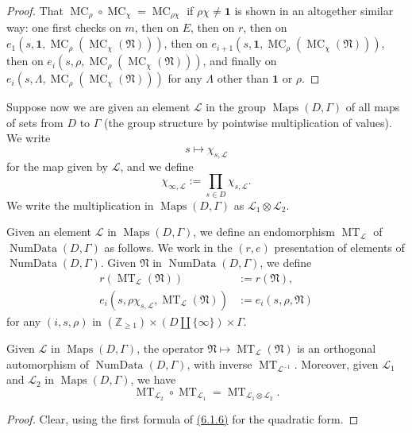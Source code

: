 \begin{proof}
That \(\operatorname{MC}_\rho\circ\operatorname{MC}_\chi=\operatorname{MC}_{\rho\chi}\) if \(\rho\chi\ne\mathbf{1}\) is shown in an altogether similar way: one first checks on \(m\), then on \(E\), then on \(r\), then on \(e_1(s,\mathbf{1},\operatorname{MC}_\rho(\operatorname{MC}_\chi(\mathfrak{N})))\), then on \(e_{i+1}(s,\mathbf{1},\operatorname{MC}_\rho(\operatorname{MC}_\chi(\mathfrak{N})))\), then on \(e_i(s,\rho,\operatorname{MC}_\rho(\operatorname{MC}_\chi(\mathfrak{N})))\), and finally on \(e_i(s,\Lambda,\operatorname{MC}_\rho(\operatorname{MC}_\chi(\mathfrak{N})))\) for any \(\Lambda\) other than \(\mathbf{1}\) or \(\rho\).
\end{proof}

Suppose now we are given an element \(\mathcal{L}\) in the group \(\operatorname{Maps}(D,\Gamma)\) of all maps of sets from \(D\) to \(\Gamma\) (the group structure by pointwise multiplication of values). We write
\[
s\mapsto \chi_{s,\mathcal{L}}
\]
for the map given by \(\mathcal{L}\), and we define
\[
\chi_{\infty,\mathcal{L}}:=\prod_{s\in D}\chi_{s,\mathcal{L}}.
\]
We write the multiplication in \(\operatorname{Maps}(D,\Gamma)\) as \(\mathcal{L}_1\otimes\mathcal{L}_2\).

Given an element \(\mathcal{L}\) in \(\operatorname{Maps}(D,\Gamma)\), we define an endomorphism \(\operatorname{MT}_{\mathcal{L}}\) of \(\operatorname{NumData}(D,\Gamma)\) as follows. We work in the \((r,e)\) presentation of elements of \(\operatorname{NumData}(D,\Gamma)\). Given \(\mathfrak{N}\) in \(\operatorname{NumData}(D,\Gamma)\), we define
\[
\begin{aligned}
r(\operatorname{MT}_{\mathcal{L}}(\mathfrak{N}))&:=r(\mathfrak{N}),\\
e_i(s,\rho\chi_{s,\mathcal{L}},\operatorname{MT}_{\mathcal{L}}(\mathfrak{N}))&:=e_i(s,\rho,\mathfrak{N})
\end{aligned}
\]
for any \((i,s,\rho)\) in \((\mathbb{Z}_{\geq 1})\times(D\amalg\{\infty\})\times\Gamma\).

Given \(\mathcal{L}\) in \(\operatorname{Maps}(D,\Gamma)\), the operator \(\mathfrak{N}\mapsto\operatorname{MT}_{\mathcal{L}}(\mathfrak{N})\) is an orthogonal automorphism of \(\operatorname{NumData}(D,\Gamma)\), with inverse \(\operatorname{MT}_{\mathcal{L}^{-1}}\). Moreover, given \(\mathcal{L}_1\) and \(\mathcal{L}_2\) in \(\operatorname{Maps}(D,\Gamma)\), we have
\[
\operatorname{MT}_{\mathcal{L}_2}\circ\operatorname{MT}_{\mathcal{L}_1}=\operatorname{MT}_{\mathcal{L}_1\otimes\mathcal{L}_2}.
\]
\begin{proof}
Clear, using the first formula of \hyperref[par:6.1.6]{(6.1.6)} for the quadratic form.
\end{proof}

